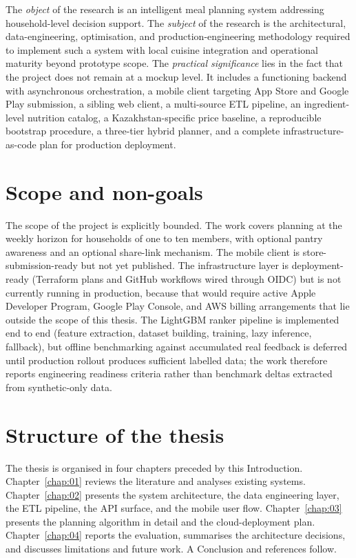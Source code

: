 The \emph{object} of the research is an intelligent meal planning system addressing household-level decision support. The \emph{subject} of the research is the architectural, data-engineering, optimisation, and production-engineering methodology required to implement such a system with local cuisine integration and operational maturity beyond prototype scope. The \emph{practical significance} lies in the fact that the project does not remain at a mockup level. It includes a functioning backend with asynchronous orchestration, a mobile client targeting App Store and Google Play submission, a sibling web client, a multi-source ETL pipeline, an ingredient-level nutrition catalog, a Kazakhstan-specific price baseline, a reproducible bootstrap procedure, a three-tier hybrid planner, and a complete infrastructure-as-code plan for production deployment.

\section{Scope and non-goals}

The scope of the project is explicitly bounded. The work covers planning at the weekly horizon for households of one to ten members, with optional pantry awareness and an optional share-link mechanism. The mobile client is store-submission-ready but not yet published. The infrastructure layer is deployment-ready (Terraform plans and GitHub workflows wired through OIDC) but is not currently running in production, because that would require active Apple Developer Program, Google Play Console, and AWS billing arrangements that lie outside the scope of this thesis. The LightGBM ranker pipeline is implemented end to end (feature extraction, dataset building, training, lazy inference, fallback), but offline benchmarking against accumulated real feedback is deferred until production rollout produces sufficient labelled data; the work therefore reports engineering readiness criteria rather than benchmark deltas extracted from synthetic-only data.

\section{Structure of the thesis}

The thesis is organised in four chapters preceded by this Introduction. Chapter~\ref{chap:01} reviews the literature and analyses existing systems. Chapter~\ref{chap:02} presents the system architecture, the data engineering layer, the ETL pipeline, the API surface, and the mobile user flow. Chapter~\ref{chap:03} presents the planning algorithm in detail and the cloud-deployment plan. Chapter~\ref{chap:04} reports the evaluation, summarises the architecture decisions, and discusses limitations and future work. A Conclusion and references follow.

\clearpage
